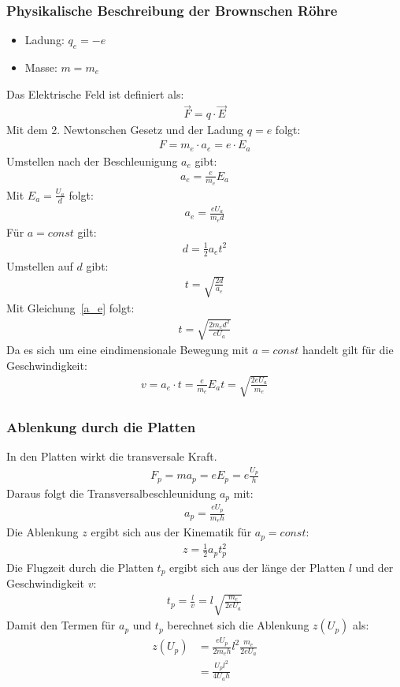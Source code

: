 \documentclass{scrartcl}
\begin{document}
\subsubsection*{Physikalische Beschreibung der Brownschen Röhre}
\begin{itemize}
\item Ladung: $q_e=-e$
\item Masse: $m=m_e$
\end{itemize}
Das Elektrische Feld ist definiert als:
\begin{align}
    \vec{F}=q\cdot \vec{E}
\end{align}
Mit dem 2. Newtonschen Gesetz und der Ladung $q=e$ folgt:
\begin{align}
    F=m_e\cdot a_e=e\cdot E_a
\end{align}
Umstellen nach der Beschleunigung $a_e$ gibt:
\begin{align}
    a_e=\frac{e}{m_e}E_a
\end{align}
Mit $E_a=\frac{U_a}{d}$ folgt:
\begin{align}
    a_e=\frac{eU_a}{m_ed}\label{a_e}
\end{align}
Für $a=const$ gilt:
\begin{align}
    d=\frac{1}{2}a_et^2
\end{align}
Umstellen auf $d$ gibt:
\begin{align}
    t=\sqrt{\frac{2d}{a_e}}
\end{align}
Mit Gleichung~\ref{a_e} folgt:
\begin{align}
    t=\sqrt{\frac{2m_ed^2}{eU_a}}\label{t_e}
\end{align}
Da es sich um eine eindimensionale Bewegung mit $a=const$ handelt gilt für die Geschwindigkeit:
\begin{align}
    v=a_e\cdot t=\frac{e}{m_e}E_at=\sqrt{\frac{2eU_a}{m_e}}
\end{align}

\subsubsection*{Ablenkung durch die Platten}
In den Platten wirkt die transversale Kraft.
\begin{align}
    F_p=ma_p=eE_p=e\frac{U_p}{h}
\end{align}
Daraus folgt die Transversalbeschleunidung $a_p$ mit:
\begin{align}
    a_p=\frac{eU_p}{m_eh}
\end{align}
Die Ablenkung $z$ ergibt sich aus der Kinematik für $a_p=const$:
\begin{align}
    z=\frac{1}{2}a_pt_p^2
\end{align}
Die Flugzeit durch die Platten $t_p$ ergibt sich aus der länge der Platten $l$ und der Geschwindigkeit $v$:
\begin{align}
    t_p=\frac{l}{v}=l\sqrt{\frac{m_e}{2eU_a}}
\end{align}
Damit den Termen für $a_p$ und $t_p$ berechnet sich die Ablenkung $z(U_p)$ als:
\begin{align}
    z(U_p)&=\frac{eU_p}{2m_eh}l^2\frac{m_e}{2eU_a}\\
    &=\frac{U_pl^2}{4U_ah}
\end{align}
\end{document}
